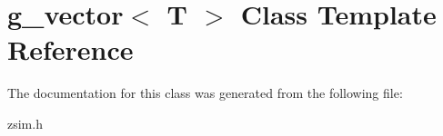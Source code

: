 \hypertarget{classg__vector}{\section{g\-\_\-vector$<$ T $>$ Class Template Reference}
\label{classg__vector}
}


The documentation for this class was generated from the following file\-:\begin{DoxyCompactItemize}
\item 
zsim.\-h\end{DoxyCompactItemize}
